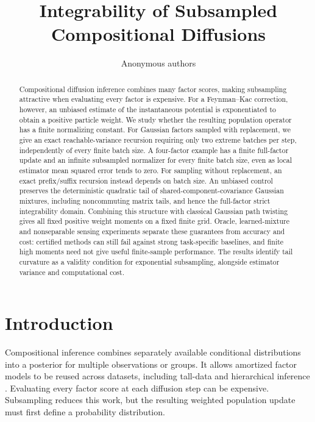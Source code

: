 \documentclass{article}
\title{Integrability of Subsampled Compositional Diffusions}
\author{Anonymous authors}
\begin{document}
\maketitle

\begin{abstract}
Compositional diffusion inference combines many factor scores, making subsampling attractive when evaluating every factor is expensive. For a Feynman--Kac correction, however, an unbiased estimate of the instantaneous potential is exponentiated to obtain a positive particle weight. We study whether the resulting population operator has a finite normalizing constant. For Gaussian factors sampled with replacement, we give an exact reachable-variance recursion requiring only two extreme batches per step, independently of every finite batch size. A four-factor example has a finite full-factor update and an infinite subsampled normalizer for every finite batch size, even as local estimator mean squared error tends to zero. For sampling without replacement, an exact prefix/suffix recursion instead depends on batch size. An unbiased control preserves the deterministic quadratic tail of shared-component-covariance Gaussian mixtures, including noncommuting matrix tails, and hence the full-factor strict integrability domain. Combining this structure with classical Gaussian path twisting gives all fixed positive weight moments on a fixed finite grid. Oracle, learned-mixture and nonseparable sensing experiments separate these guarantees from accuracy and cost: certified methods can still fail against strong task-specific baselines, and finite high moments need not give useful finite-sample performance. The results identify tail curvature as a validity condition for exponential subsampling, alongside estimator variance and computational cost.
\end{abstract}

\section{Introduction}
Compositional inference combines separately available conditional distributions into a posterior for multiple observations or groups. It allows amortized factor models to be reused across datasets, including tall-data and hierarchical inference \citep{linhart2026,arruda2026}. Evaluating every factor score at each diffusion step can be expensive. Subsampling reduces this work, but the resulting weighted population update must first define a probability distribution.
\end{document}
